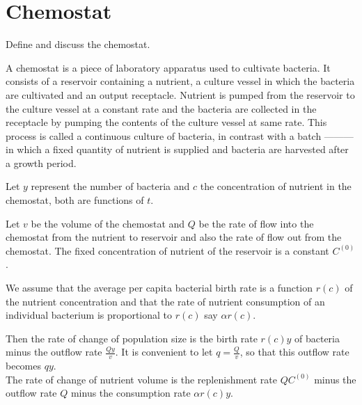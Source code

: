\documentclass[../main-sheet.tex]{subfiles}
\begin{document}
\section{Chemostat}
\begin{prob}
    Define and discuss the chemostat.
\end{prob}
\begin{soln}
    A chemostat is a piece of laboratory apparatus used to cultivate bacteria. It consists of a reservoir containing a nutrient, a culture vessel in which the bacteria are cultivated and an output receptacle. Nutrient is pumped from the reservoir to the culture vessel at a constant rate and the bacteria are collected in the receptacle by pumping the contents of the culture vessel at same rate. This process is called a continuous culture of bacteria, in contrast with a batch --------- in which a fixed quantity of nutrient is supplied and bacteria are harvested after a growth period.

    Let \(y\) represent the number of bacteria and \(c\) the concentration of nutrient in the chemostat, both are functions of \(t\).

    Let \(v\) be the volume of the chemostat and \(Q\) be the rate of flow into the chemostat from the nutrient to reservoir and also the rate of flow out from the chemostat. The fixed concentration of nutrient of the reservoir is a constant \(C^{(0)}\).

    We assume that the average per capita bacterial birth rate is a function \(r(c)\) of the nutrient concentration and that the rate of nutrient consumption of an individual bacterium is proportional to \(r(c)\) say \(\alpha r(c)\).

    Then the rate of change of population size is the birth rate \(r(c)y\) of bacteria minus the outflow rate \(\frac{Qy}{v}\). It is convenient to let \(q=\frac{Q}{v}\), so that this outflow rate becomes \(qy\).\\
    The rate of change of nutrient volume is the replenishment rate \(QC^{(0)}\) minus the outflow rate \(Q\) minus the consumption rate \(\alpha r(c)y\).


\end{soln}
\end{document}
